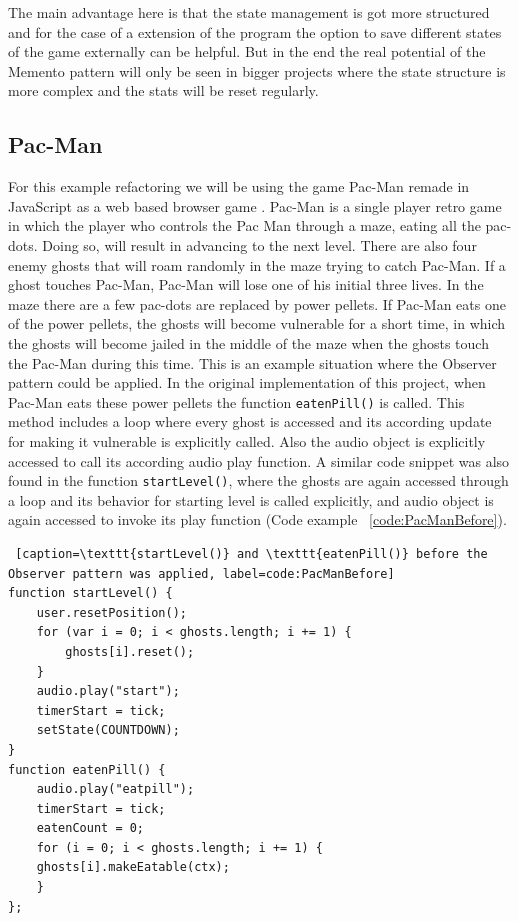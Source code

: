 \documentclass{bioinfo}
\begin{document}
The main advantage here is that the state management is got more structured and for the case of a extension of the program the option to save different states of the game externally can be helpful. But in the end the real potential of the Memento pattern will only be seen in bigger projects where the state structure is more complex and the stats will be reset regularly.

\subsection{Pac-Man}
For this example refactoring we will be using the game Pac-Man remade in JavaScript as a web based browser game \cite{pacman}. Pac-Man is a single player retro game in which the player who controls the Pac Man through a maze, eating all the pac-dots. \cite{wiki:pacman} Doing so, will result in advancing to the next level. There are also four enemy ghosts that will roam randomly in the maze trying to catch Pac-Man. If a ghost touches Pac-Man, Pac-Man will lose one of his initial three lives. In the maze there are a few pac-dots are replaced by power pellets. If Pac-Man eats one of the power pellets, the ghosts will become vulnerable for a short time, in which the ghosts will become jailed in the middle of the maze when the ghosts touch the Pac-Man during this time. This is an example situation where the Observer pattern could be applied. In the original implementation of this project, when Pac-Man eats these power pellets the function \texttt{eatenPill()} is called. This method includes a loop where every ghost is accessed and its according update for making it vulnerable is explicitly called. Also the audio object is explicitly accessed to call its according audio play function. A similar code snippet was also found in the function \texttt{startLevel()}, where the ghosts are again accessed through a loop and its behavior for starting level is called explicitly, and audio object is again accessed to invoke its play function (Code example ~\ref{code:PacManBefore}).

\begin{lstlisting} [caption=\texttt{startLevel()} and \texttt{eatenPill()} before the Observer pattern was applied, label=code:PacManBefore]
function startLevel() {        
    user.resetPosition();
    for (var i = 0; i < ghosts.length; i += 1) { 
        ghosts[i].reset();
    }
    audio.play("start");
    timerStart = tick;
    setState(COUNTDOWN);
}
function eatenPill() {
    audio.play("eatpill");
    timerStart = tick;
    eatenCount = 0;
    for (i = 0; i < ghosts.length; i += 1) {
    ghosts[i].makeEatable(ctx);
    }        
};
\end{lstlisting}
\end{document}
